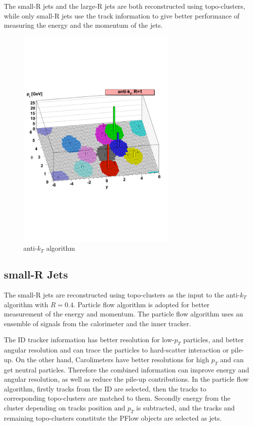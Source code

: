 The small-R jets and the large-R jets are both reconstructed using topo-clusters, while only small-R jets use the track information to give better performance of measuring the energy and the momentum of the jets.

\begin{figure}[tbp]
\begin{center}
 \includegraphics[width=0.70\textwidth,keepaspectratio]{figures/Reconstruction/antikt}
\caption{
anti-$k_T$ algorithm \cite{Cacciari_2008}
}
\label{fig:antikt}
\end{center}
\end{figure}

\subsection{small-R Jets}
The small-R jets are reconstructed using topo-clusters as the input to the anti-$k_T$ algorithm with $R = 0.4$. Particle flow algorithm \cite{PERF-2015-09} is adopted for better measurement of the energy and momentum. The particle flow algorithm uses an ensemble of signals from the calorimeter and the inner tracker. 

The ID tracker information has better resolution for low-$p_T$ particles, and better angular resolution and can trace the particles to hard-scatter
interaction or pile-up. On the other hand, Carolimeters have better resolutions for high $p_T$ and can get neutral particles. Therefore the combined information can improve energy and angular resolution, as well as reduce the pile-up contributions.
In the particle flow algorithm, firstly tracks from the ID are selected, then the tracks to corresponding topo-clusters are matched to them. Secondly energy from the cluster depending on tracks position and $p_T$ is subtracted, and the tracks and remaining topo-clusters constitute the PFlow objects are selected as jets.

